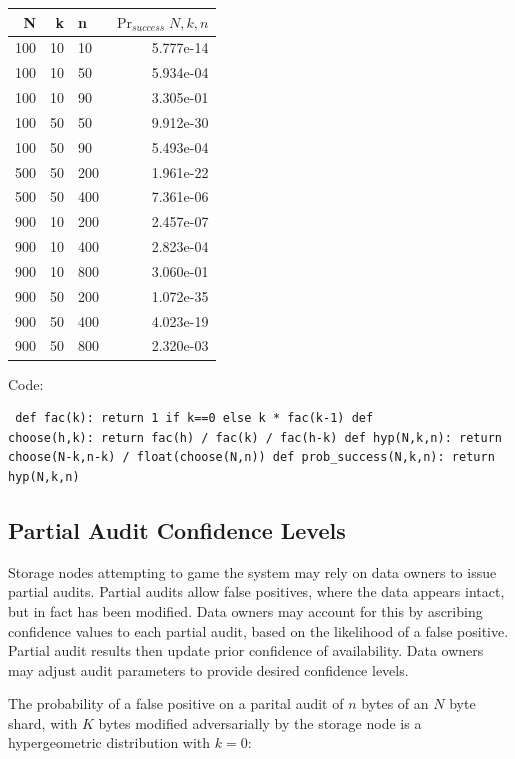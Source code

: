 \documentclass[a4paper,10pt]{article} \usepackage[utf8]{inputenc}
\begin{document}
\begin{table}[hbt!] \begin{center} \begin{tabular}{r r l r} N & k & n &
$\Pr_{success}{N,k,n}$\\ \hline 100 & 10 & 10  & 5.777e-14\\ \hline 100 & 10 &
50  & 5.934e-04\\ \hline 100 & 10 & 90  & 3.305e-01\\ \hline 100 & 50 & 50  &
9.912e-30\\ \hline 100 & 50 & 90  & 5.493e-04\\ \hline 500 & 50 & 200 &
1.961e-22\\ \hline 500 & 50 & 400 & 7.361e-06\\ \hline 900 & 10 & 200 &
2.457e-07\\ \hline 900 & 10 & 400 & 2.823e-04\\ \hline 900 & 10 & 800 &
3.060e-01\\ \hline 900 & 50 & 200 & 1.072e-35\\ \hline 900 & 50 & 400 &
4.023e-19\\ \hline 900 & 50 & 800 & 2.320e-03\\ \end{tabular} \end{center}
\end{table}

Code: \begin{lstlisting} def fac(k): return 1 if k==0 else k * fac(k-1) def
choose(h,k): return fac(h) / fac(k) / fac(h-k) def hyp(N,k,n): return
choose(N-k,n-k) / float(choose(N,n)) def prob_success(N,k,n): return hyp(N,k,n)
\end{lstlisting}

\subsection{Partial Audit Confidence Levels}

Storage nodes attempting to game the system may rely on data owners to issue 
partial
audits. Partial audits allow false positives, where the data appears intact, but
in fact has been modified. Data owners may account for this by ascribing
confidence values to each partial audit, based on the likelihood of a false
positive. Partial audit results then update prior confidence of availability.
Data owners may adjust audit parameters to provide desired confidence levels.

The probability of a false positive on a parital audit of $ n $ bytes of an $ N
$ byte shard, with $ K $ bytes modified adversarially by the storage node is a
hypergeometric distribution with $ k = 0 $:
\end{document}
